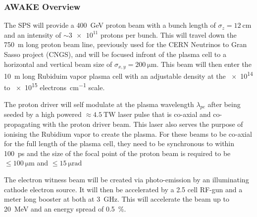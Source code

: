\subsubsection{AWAKE Overview}

The SPS will provide a \SI{400}{\giga\electronvolt} proton beam with a bunch
length of \(\sigma_z = \SI{12}{\centi\meter}\) and an intensity of \(\sim
\num{3e11}\) protons per bunch. This will travel down the \SI{750}{\meter} long
proton beam line, previously used for the CERN Neutrinos to Gran Sasso project
(CNGS), and will be focused infront of the plasma cell to a horizontal and
vertical beam size of \(\sigma_{x,y} = \SI{200}{\micro\meter}\). This beam will
then enter the \SI{10}{\meter} long Rubiduim vapor plasma cell with an
adjustable density at the \num{e14} to \num{e15} \si{electrons\per\centi\meter}
scale.

The proton driver will self modulate at the plasma wavelength \(\lambda_{pe}\)
after being seeded by a high powered \(\approx \SI{4.5}{\tera\watt}\) laser
pulse that is co-axial and co-propagating with the proton driver beam. This
laser also serves the purpose of ionising the Rubidium vapor to create the
plasma. For these beams to be co-axial for the full length of the plasma cell,
they need to be synchronous to within \SI{100}{\pico\second} and the size of the
focal point of the proton beam is required to be \(\le\SI{100}{\micro\meter}\)
and \(\le\SI{15}{\micro\radian}\)

The electron witness beam will be created via photo-emission by an illuminating
cathode electron source. It will then be accelerated by a 2.5 cell RF-gun and a
meter long booster at both at \SI{3}{\giga\hertz}.  This will accelerate the
beam up to \SI{20}{\mega\electronvolt} and an energy spread of
\SI{0.5}{\percent}.





